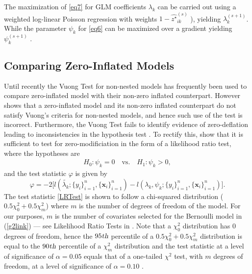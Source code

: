 \documentclass[12pt,letterpaper]{article}
\numberwithin{equation}{section}
\numberwithin{equation}{section}
\numberwithin{equation}{section}
\newcommand{\zz}{z^\star}
\begin{document}
The maximization of \eqref{eq7} for GLM coefficients $\lambda_k$ can be carried out using a weighted log-linear Poisson regression with weights $1 - \hat{\zz}_{ik}^{(s)}$ \citep[see][]{McCullaghNelder1989}), yielding $\lambda_k^{(s+1)}$.
While the parameter $\psi_k$ for \eqref{eq6} can be maximized over a gradient yielding $\psi_k^{(s+1)}$ \citep[see][]{Lambert}. 

\subsection{Comparing Zero-Inflated Models}\label{subsec:: compareZero}

Until recently the Vuong Test for non-nested models  \citep{vuongTest} has frequently been used to compare zero-inflated model with their non-zero inflated counterpart. However \cite{misuse} shows that a zero-inflated model and its non-zero inflated counterpart do not satisfy Vuong's criteria for non-nested models, and hence such use of the test is incorrect. Furthermore, the Vuong Test fails to identify evidence of zero-deflation leading to inconsistencies in the hypothesis test \citep[see][]{misuse}. To rectify this, \cite{newIntuitive} show that it is sufficient to test for zero-modificiation in the form of a likelihood ratio test, where the hypotheses are
\begin{align*}
& & H_0: \psi_k = 0 \quad \text{vs.} \quad H_1: \psi_k > 0, & &
\end{align*}
and the test statistic $\varphi$ is given by
\begin{equation}
\varphi = -2 \big[l(\tilde{\lambda_k}; \{y_i\}_{i=1}^n,\{\bm{x}_i\}_{i=1}^n) - l(\lambda_k, \psi_k; \{y_i\}_{i=1}^n,\{\bm{x}_i\}_{i=1}^n )\big].
\label{LRTest}
\end{equation}
The test statistic \eqref{LRTest} is shown to follow a chi-squared distribution ($0.5\chi^2_0+0.5\chi^2_{m}$) where $m$ is the  number of degrees of freedom of the model. For our purposes, $m$ is the number of covariates selected for the Bernoulli model in (\ref{g2link}) --- see Likelihood Ratio Tests in \cite{newIntuitive}. Note that  a $\chi^2_0$ distribution has 0 degrees of freedom, hence the $95{\mbox{\sl{th}}}$ percentile of a  $0.5\chi^2_0+0.5\chi^2_{m}$ distribution is equal to the $90{\mbox{\sl{th}}}$ percentile of a $\chi^2_{m}$ distribution and the test statistic at a level of significance of $\alpha=0.05$ equals that of a one-tailed $\chi^2$ test, with $m$ degrees of freedom, at a level of significance of $\alpha=0.10$ \citep[see][]{newIntuitive}. 
\end{document}
